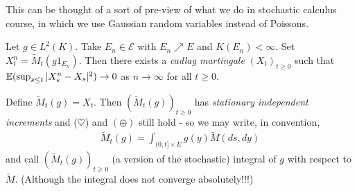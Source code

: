 \documentclass[12pt,a4paper]{report}
\begin{document}
This can be thought of a sort of pre-view of what we do in stochastic calculus course, in which we use Gaussian random variables instead of Poissons.
\s

 Let $g\in L^2(K)$. Take $E_n \in \mathscr{E}$ with $E_n \nearrow E$ and $K(E_n) < \infty$. Set $X_t^n = \tilde{M}_t(g1_{E_n})$. Then there exists a \emph{cadlag martingale} $(X_t)_{t\geq 0}$ such that $\mathbb{E}(\sup_{s\leq t} |X_s^n - X_s|^2) \rightarrow 0$ as $n\rightarrow \infty$ for all $t\geq 0$. 

\quad Define $\tilde{M}_t(g) = X_t$. Then $(\tilde{M}_t(g))_{t\geq 0}$ has \emph{stationary independent increments} and ($\heartsuit$) and $(\oplus)$ still hold - so we may write, in convention,
\begin{align*}
\tilde{M}_t(g) = \int_{(0,t] \times E} g(y) \tilde{M}(ds,dy)
\end{align*}
and call $(\tilde{M}_t(g))_{t\geq 0}$ (a version of the stochastic) integral of $g$ with respect to $\tilde{M}$. (Although the integral does not converge absolutely!!!)
\end{document}
